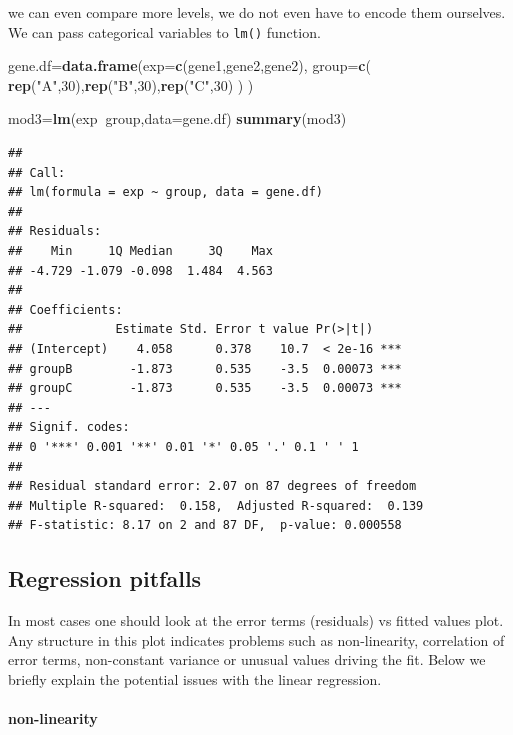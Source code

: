 \documentclass[12pt,]{krantz}
\newenvironment{Shaded}{\begin{snugshade}}{\end{snugshade}}
\newcommand{\DataTypeTok}[1]{\textcolor[rgb]{0.13,0.29,0.53}{#1}}
\newcommand{\DecValTok}[1]{\textcolor[rgb]{0.00,0.00,0.81}{#1}}
\newcommand{\KeywordTok}[1]{\textcolor[rgb]{0.13,0.29,0.53}{\textbf{#1}}}
\newcommand{\NormalTok}[1]{#1}
\newcommand{\OperatorTok}[1]{\textcolor[rgb]{0.81,0.36,0.00}{\textbf{#1}}}
\newcommand{\StringTok}[1]{\textcolor[rgb]{0.31,0.60,0.02}{#1}}
\let\oldparagraph\paragraph
\renewcommand{\paragraph}[1]{\oldparagraph{#1}\mbox{}}
\theoremstyle{definition}
\theoremstyle{definition}
\theoremstyle{definition}
\theoremstyle{remark}
\begin{document}
we can even compare more levels, we do not even have to encode them
ourselves. We can pass categorical variables to \texttt{lm()} function.

\begin{Shaded}
\begin{Highlighting}[]
\NormalTok{gene.df=}\KeywordTok{data.frame}\NormalTok{(}\DataTypeTok{exp=}\KeywordTok{c}\NormalTok{(gene1,gene2,gene2),}
                  \DataTypeTok{group=}\KeywordTok{c}\NormalTok{( }\KeywordTok{rep}\NormalTok{(}\StringTok{"A"}\NormalTok{,}\DecValTok{30}\NormalTok{),}\KeywordTok{rep}\NormalTok{(}\StringTok{"B"}\NormalTok{,}\DecValTok{30}\NormalTok{),}\KeywordTok{rep}\NormalTok{(}\StringTok{"C"}\NormalTok{,}\DecValTok{30}\NormalTok{) ) }
\NormalTok{                  )}

\NormalTok{mod3=}\KeywordTok{lm}\NormalTok{(exp}\OperatorTok{~}\NormalTok{group,}\DataTypeTok{data=}\NormalTok{gene.df)}
\KeywordTok{summary}\NormalTok{(mod3)}
\end{Highlighting}
\end{Shaded}

\begin{verbatim}
## 
## Call:
## lm(formula = exp ~ group, data = gene.df)
## 
## Residuals:
##    Min     1Q Median     3Q    Max 
## -4.729 -1.079 -0.098  1.484  4.563 
## 
## Coefficients:
##             Estimate Std. Error t value Pr(>|t|)    
## (Intercept)    4.058      0.378    10.7  < 2e-16 ***
## groupB        -1.873      0.535    -3.5  0.00073 ***
## groupC        -1.873      0.535    -3.5  0.00073 ***
## ---
## Signif. codes:  
## 0 '***' 0.001 '**' 0.01 '*' 0.05 '.' 0.1 ' ' 1
## 
## Residual standard error: 2.07 on 87 degrees of freedom
## Multiple R-squared:  0.158,  Adjusted R-squared:  0.139 
## F-statistic: 8.17 on 2 and 87 DF,  p-value: 0.000558
\end{verbatim}

\hypertarget{regression-pitfalls}{%
\subsection{Regression pitfalls}\label{regression-pitfalls}}

In most cases one should look at the error terms (residuals) vs fitted
values plot. Any structure in this plot indicates problems such as
non-linearity, correlation of error terms, non-constant variance or
unusual values driving the fit. Below we briefly explain the potential
issues with the linear regression.

\hypertarget{non-linearity}{%
\paragraph{non-linearity}\label{non-linearity}}
\end{document}
